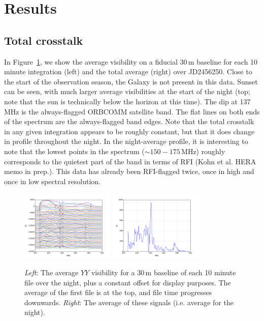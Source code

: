 \documentclass[10pt,a4paper,notitlepage]{article}
\begin{document}
\section{Results}
\label{sec:results}

\subsection{Total crosstalk}
In Figure~\ref{fig:xtalk-per-file}, we show the average visibility on a fiducial 30\,m baseline for each 10 minute integration (left) and the total average (right) over JD2456250. Close to the start of the observation season, the Galaxy is not present in this data. Sunset can be seen, with much larger average visibilities at the start of the night (top; note that the sun is technically below the horizon at this time). The dip at 137\,MHz is the always-flagged ORBCOMM satellite band. The flat lines on both ends of the spectrum are the always-flagged band edges. Note that the total crosstalk in any given integration appears to be roughly constant, but that it does change in profile throughout the night. In the night-average profile, it is interesting to note that the lowest points in the spectrum ($\sim150-175$\,MHz) roughly corresponds to the quietest part of the band in terms of RFI (Kohn et al. HERA memo in prep.). This data has already been RFI-flagged twice, once in high and once in low spectral resolution. \\

\begin{figure}
\centering
\includegraphics[width=0.4\textwidth]{6250_yy_xtalk_per_file.png}
\includegraphics[width=0.4\textwidth]{6250_yy_xtalk_that_night.png}
\caption{\textit{Left}: The average $YY$ visibility for a 30\,m baseline of each 10 minute file over the night, plus a constant offset for display purposes. The average of the first file is at the top, and file time progresses downwards. \textit{Right}: The average of these signals (i.e. average for the night).}
\label{fig:xtalk-per-file}
\end{figure}
\end{document}
